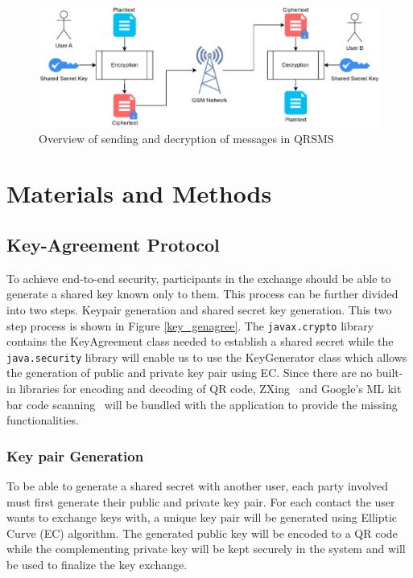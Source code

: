 \documentclass[journal]{./IEEE/IEEEtran}
\begin{document}
\begin{figure}
	\centering
	\includegraphics[width=6in]{images/encrypted_messaging.eps}
	\caption{Overview of sending and decryption of messages in
		QRSMS}
	\label{encrypted}
\end{figure}

\section{Materials and Methods}
\subsection{Key-Agreement Protocol}
To achieve end-to-end security, participants in the exchange should be able to
generate a shared key known only to them. This process can be further divided
into two steps. Keypair generation and shared secret key generation. This two
step process is shown in Figure \ref{key_genagree}.
The \lstinline{javax.crypto} library contains the KeyAgreement class needed to
establish a shared secret while the \lstinline{java.security} library
will enable us to use the KeyGenerator class which allows the generation of
public and private key pair using EC. Since there are no built-in libraries
for encoding and decoding of QR code, ZXing~\cite{zxing} and Google's ML
kit bar code scanning~\cite{mlkit} will be bundled with the application to
provide the missing functionalities.

\subsubsection{Key pair Generation}
To be able to generate a shared secret with another user, each party involved
must first generate their public and private key pair. For each contact the
user wants to exchange keys with, a unique key pair will be generated
using Elliptic Curve (EC) algorithm.
The generated public key will be encoded to a QR code while the complementing
private key will be kept securely in the system and will be used to finalize
the key exchange.
\end{document}
